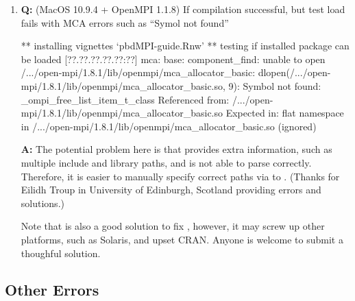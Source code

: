\begin{enumerate}
\item {\bf\color{blue} Q:} 
      (MacOS 10.9.4 + OpenMPI 1.1.8) If compilation successful, but test load
      fails with MCA errors such as ``Symol not found''
\begin{Error}
** installing vignettes
   `pbdMPI-guide.Rnw'
** testing if installed package can be loaded
[??.??.??.??.??:??] mca: base: component_find: unable to open
/.../open-mpi/1.8.1/lib/openmpi/mca_allocator_basic:
dlopen(/.../open-mpi/1.8.1/lib/openmpi/mca_allocator_basic.so, 9):
Symbol not found: _ompi_free_list_item_t_class
  Referenced from: /.../open-mpi/1.8.1/lib/openmpi/mca_allocator_basic.so
  Expected in: flat namespace
 in /.../open-mpi/1.8.1/lib/openmpi/mca_allocator_basic.so (ignored)
\end{Error}
      {\bf\color{blue} A:}
      The potential problem here is that  provides
      extra information, such as multiple include and library paths, and
       is not able to parse correctly. Therefore, it is
      easier to manually specify correct paths via 
      to .
      (Thanks for Eilidh Troup in University of Edinburgh, Scotland
       providing errors and solutions.)
      Note that \code{ACX_MPI} is also a good solution to fix
      \code{configure.ac}, however, it may screw up other platforms,
      such as Solaris, and upset CRAN. Anyone is welcome to submit a
      thoughful solution.

\end{enumerate}


\subsection[Other Errors]{Other Errors}
\label{sec:other_errors}



